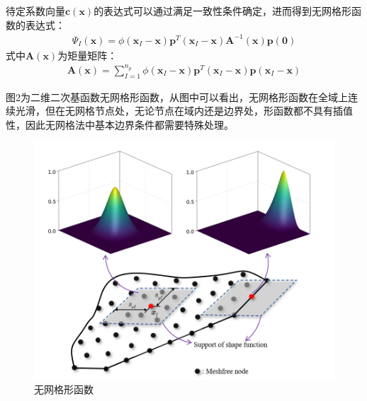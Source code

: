 \documentclass[a4paper]{article}
\begin{document}
待定系数向量$\pmb{c}(\pmb{x})$的表达式可以通过满足一致性条件确定，进而得到无网格形函数的表达式：
\begin{equation}
\begin{split}
\Psi_I(\pmb{x})=\phi(\pmb{x}_I-\pmb{x})\pmb{p}^T(\pmb{x}_I-\pmb{x})\pmb{A}^{-1}(\pmb{x})\pmb{p}(\pmb 0)
\end{split}
\end{equation}
式中$\pmb{A}(\pmb{x})$为矩量矩阵：
\begin{equation}
\begin{split}
    \pmb{A}(\pmb{x})=\sum_{I=1}^{n_p}\phi(\pmb{x}_I-\pmb{x})\pmb{p}^T(\pmb{x}_I-\pmb{x})\pmb{p}(\pmb{x}_I-\pmb{x})
\end{split}
\end{equation}\par
图2为二维二次基函数无网格形函数，从图中可以看出，无网格形函数在全域上连续光滑，但在无网格节点处，无论节点在域内还是边界处，形函数都不具有插值性，因此无网格法中基本边界条件都需要特殊处理。
\begin{figure}[!h]
    \centering
    \includegraphics[scale=1]{firgure/zaishenghe.png}
    \caption{无网格形函数}
\end{figure}\newpage
\end{document}
